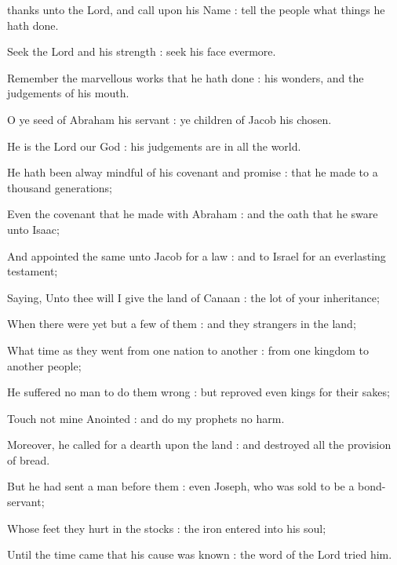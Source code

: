 

 thanks unto the Lord, and call upon his Name : tell the people what things he hath done.\par
{}
Seek the Lord and his strength : seek his face evermore.\par
{}Remember the marvellous works that he hath done : his wonders, and the judgements of his mouth.\par
{}O ye seed of Abraham his servant : ye children of Jacob his chosen.\par
{}He is the Lord our God : his judgements are in all the world.\par
{}He hath been alway mindful of his covenant and promise : that he made to a thousand generations;\par
{}Even the covenant that he made with Abraham : and the oath that he sware unto Isaac;\par
{}And appointed the same unto Jacob for a law : and to Israel for an everlasting testament;\par
{}Saying, Unto thee will I give the land of Canaan : the lot of your inheritance;\par
{}When there were yet but a few of them : and they strangers in the land;\par
{}What time as they went from one nation to another : from one kingdom to another people;\par
{}He suffered no man to do them wrong : but reproved even kings for their sakes;\par
{}Touch not mine Anointed : and do my prophets no harm.\par
{}Moreover, he called for a dearth upon the land : and destroyed all the provision of bread.\par
{}But he had sent a man before them : even Joseph, who was sold to be a bond-servant;\par
{}Whose feet they hurt in the stocks : the iron entered into his soul;\par
{}Until the time came that his cause was known : the word of the Lord tried him.\par
